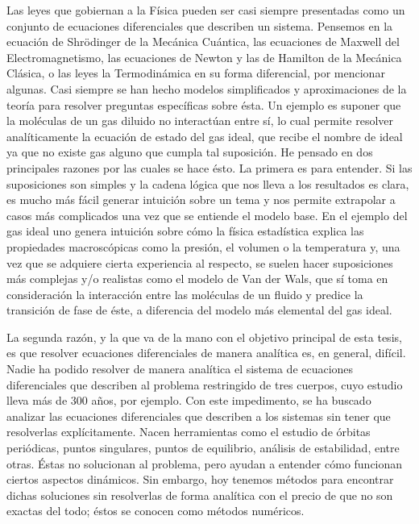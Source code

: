 Las leyes que gobiernan a la Física pueden ser casi siempre presentadas como un conjunto de ecuaciones diferenciales que describen un sistema. Pensemos en la ecuación de Shrödinger de la Mecánica Cuántica, las ecuaciones de Maxwell del Electromagnetismo, las ecuaciones de Newton y las de Hamilton de la Mecánica Clásica, o las leyes la Termodinámica en su forma diferencial, por mencionar algunas. Casi siempre se han hecho modelos simplificados y aproximaciones de la teoría para resolver preguntas específicas sobre ésta. Un ejemplo es suponer que la moléculas de un gas diluido no interactúan entre sí, lo cual permite resolver analíticamente la ecuación de estado del gas ideal, que recibe el nombre de ideal ya que no existe gas alguno que cumpla tal suposición. He pensado en dos principales razones por las cuales se hace ésto. La primera es para entender. Si las suposiciones son simples y la cadena lógica que nos lleva a los resultados es clara, es mucho más fácil generar intuición sobre un tema y nos permite extrapolar a casos más complicados una vez que se entiende el modelo base. En el ejemplo del gas ideal uno genera intuición sobre cómo la física estadística explica las propiedades macroscópicas como la presión, el volumen o la temperatura y, una vez que se adquiere cierta experiencia al respecto, se suelen hacer suposiciones más complejas y/o realistas como el modelo de Van der Wals, que sí toma en consideración la interacción entre las moléculas de un fluido y predice la transición de fase de éste, a diferencia del modelo más elemental del gas ideal. 

La segunda razón, y la que va de la mano con el objetivo principal de esta tesis, es que resolver ecuaciones diferenciales de manera analítica es, en general, difícil. Nadie ha podido resolver de manera analítica el sistema de ecuaciones diferenciales que describen al problema restringido de tres cuerpos, cuyo estudio lleva más de 300 años, por ejemplo. Con este impedimento, se ha buscado analizar las ecuaciones diferenciales que describen a los sistemas sin tener que resolverlas explícitamente. Nacen herramientas como el estudio de órbitas periódicas, puntos singulares, puntos de equilibrio, análisis de estabilidad, entre otras. Éstas no solucionan al problema, pero ayudan a entender cómo funcionan ciertos aspectos dinámicos. Sin embargo, hoy tenemos métodos para encontrar dichas soluciones sin resolverlas de forma analítica con el precio de que no son exactas del todo; éstos se conocen como métodos numéricos. 

